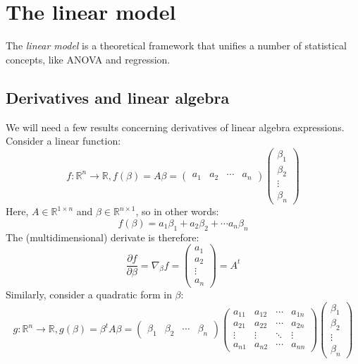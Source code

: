 \documentclass[12pt, a4paper]{article}
\begin{document}
\section{The linear model}
The \textit{linear model} is a theoretical framework that unifies a number of statistical concepts, like ANOVA and regression.

\subsection{Derivatives and linear algebra}
We will need a few results concerning derivatives of linear algebra expressions. Consider a linear function:
\begin{equation}
f: \mathbb{R}^n\rightarrow\mathbb{R}, f(\beta)=A\beta=
\begin{pmatrix}
a_1 & a_2 & \cdots & a_n
\end{pmatrix}
\begin{pmatrix}
\beta_1 \\ \beta_2 \\ \vdots \\ \beta_n
\end{pmatrix}
\end{equation}
Here, $A\in\mathbb{R}^{1\times n}$ and $\beta\in\mathbb{R}^{n\times 1}$, so in other words:
\begin{equation}
f(\beta)=a_1\beta_1+a_2\beta_2+\cdots a_n\beta_n
\end{equation}
The (multidimensional) derivate is therefore:
\begin{equation}
\label{scalarproductdif}
\frac{\partial f}{\partial \beta}=\nabla_\beta f=
\begin{pmatrix}
a_1 \\ a_2 \\ \vdots \\ a_n
\end{pmatrix}
=A^t
\end{equation}
Similarly, consider a quadratic form in $\beta$:
\begin{equation}
g: \mathbb{R}^n\rightarrow\mathbb{R}, g(\beta)=\beta^t A\beta =
\begin{pmatrix}
\beta_1 & \beta_2 & \cdots & \beta_n
\end{pmatrix}
\begin{pmatrix}
a_{11} & a_{12} & \cdots & a_{1n} \\
a_{21} & a_{22} & \cdots & a_{2n} \\
\vdots & \vdots & \ddots & \vdots \\
a_{n1} & a_{n2} & \cdots & a_{nn}
\end{pmatrix}
\begin{pmatrix}
\beta_1 \\ \beta_2 \\ \vdots \\ \beta_n
\end{pmatrix}
\end{equation}
\end{document}
